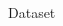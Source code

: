 \begin{frame}{Dataset}{}
\begin{block}{}
\begin{columns}
\begin{column}{1\textwidth}
            \end{column}

        \end{columns}




    \end{block}
\end{frame}


